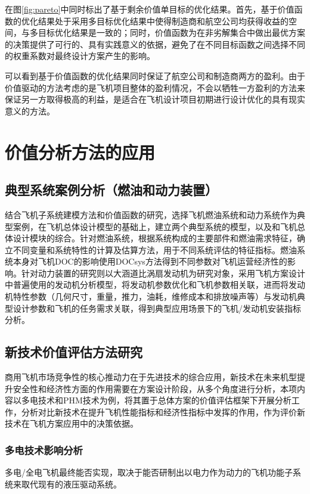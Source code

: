 \documentclass[12pt,a4paper]{report}
\begin{document}
在图\ref{fig:pareto}中同时标出了基于剩余价值单目标的优化结果。首先，基于价值函数的优化结果处于采用多目标优化结果中使得制造商和航空公司均获得收益的空间，与多目标优化结果是一致的；同时，价值函数为在非劣解集合中做出最优方案的决策提供了可行的、具有实践意义的依据，避免了在不同目标函数之间选择不同的权重系数对最终设计方案产生的影响。


可以看到基于价值函数的优化结果同时保证了航空公司和制造商两方的盈利。由于价值驱动的方法考虑的是飞机项目整体的盈利情况，不会以牺牲一方盈利的方法来保证另一方取得极高的利益，是适合在飞机设计项目初期进行设计优化的具有现实意义的方法。





\chapter{价值分析方法的应用}


\section{典型系统案例分析（燃油和动力装置）}
结合飞机子系统建模方法和价值函数的研究，选择飞机燃油系统和动力系统作为典型案例，在飞机总体设计模型的基础上，建立两个典型系统的模型，以及和飞机总体设计模块的综合。针对燃油系统，根据系统构成的主要部件和燃油需求特征，确立不同变量和系统特性的计算及估算方法，用于不同系统评估的特征指标。燃油系统本身对飞机DOC的影响使用DOCsys方法得到不同参数对飞机运营经济性的影响。针对动力装置的研究则以大涵道比涡扇发动机为研究对象，采用飞机方案设计中普遍使用的发动机分析模型，将发动机参数优化和飞机参数相关联，进而将发动机特性参数（几何尺寸，重量，推力，油耗，维修成本和排放噪声等）与发动机典型设计参数和飞机的任务需求关联，得到典型应用场景下的飞机/发动机安装指标分析。


\section{新技术价值评估方法研究}

商用飞机市场竞争性的核心推动力在于先进技术的综合应用，新技术在未来机型提升安全性和经济性方面的作用需要在方案设计阶段，从多个角度进行分析，本项内容以多电技术和PHM技术为例，将其置于总体方案的价值评估框架下开展分析工作，分析对比新技术在提升飞机性能指标和经济性指标中发挥的作用，作为评价新技术在飞机方案应用中的决策依据。


\subsection{多电技术影响分析}
多电/全电飞机最终能否实现，取决于能否研制出以电力作为动力的飞机功能子系统来取代现有的液压驱动系统。
\end{document}
